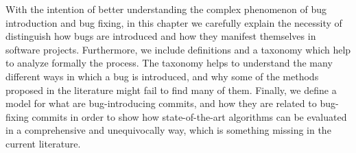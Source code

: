 \documentclass[a4paper, 12pt]{book}
\begin{document}
With the intention of better understanding the complex phenomenon of bug introduction and bug fixing, in this chapter we carefully explain the necessity of distinguish how bugs are introduced and how they manifest themselves in software projects. Furthermore, we include definitions and a taxonomy which help to analyze formally the process. The taxonomy helps to understand the many different ways in which a bug is introduced, and why some of the methods proposed in the literature might fail to find many of them. Finally, we define a model for what are bug-introducing commits, and how they are related to bug-fixing commits in order to show how state-of-the-art algorithms can be evaluated in a comprehensive and unequivocally way, which is something missing in the current literature.



%
\end{document}
